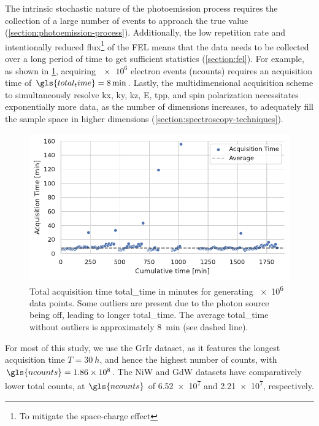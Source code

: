The intrinsic stochastic nature of the photoemission process requires the collection of a large number of events to approach the true value (\cref{section:photoemission-process}). Additionally, the low repetition rate and intentionally reduced flux\footnote{To mitigate the space-charge effect} of the \gls{FEL} means that the data  needs to be collected over a long period of time to get sufficient statistics (\cref{section:fel}). For example, as shown in \cref{fig:acq-time-1M}, acquiring $\num{e6}$ electron events (\gls{ncounts})  requires an acquisition time of $\gls{total_time}=\qty{8}{\min}$. Lastly, the multidimensional acquisition scheme to simultaneously resolve \gls{kx}, \gls{ky}, \gls{kz}, \gls{E}, \gls{tpp}, and spin polarization necessitates exponentially  more data, as the number of dimensions increases, to adequately fill the sample space in higher dimensions (\cref{section:spectroscopy-techniques}).

\begin{figure}[h]
    \centering
    \includegraphics[width=0.8\linewidth]{images/acq_time_1M.pdf}
    \caption{Total acquisition time \gls{total_time} in minutes for generating \num{e6} data points. Some outliers are present due to the photon source being off, leading to longer \gls{total_time}. The average \gls{total_time} without outliers is approximately \qty{8}{min} (see dashed line).}
    \label{fig:acq-time-1M}
\end{figure}

For most of this study, we use the \gls{GrIr} dataset, as it features the longest acquisition time $T=\qty{30}{h}$, and hence the highest number of counts, with $\gls{ncounts}=\num{1.86e8}$. The \gls{NiW} and \gls{GdW} datasets have comparatively lower total counts, at $\gls{ncounts}$ of \num{6.52e7} and \num{2.21e7}, respectively. 

